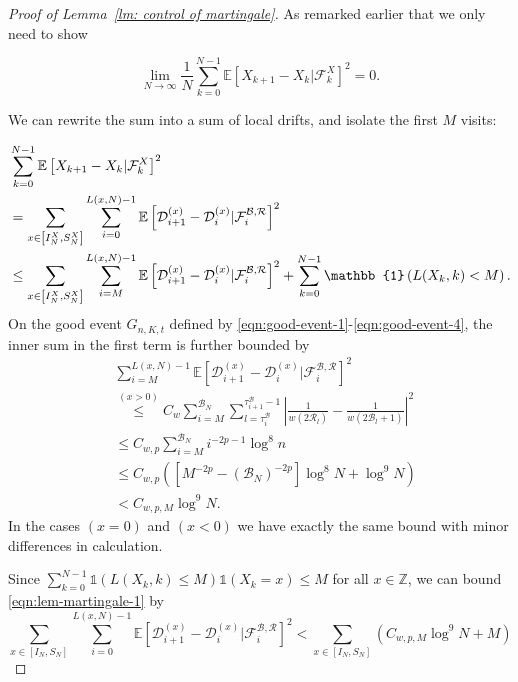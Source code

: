 \documentclass[twoside,12pt, a4paper]{article}
\numberwithin{equation}{section}
\theoremstyle{remark}
\begin{document}
	\begin{proof}[Proof of Lemma~\ref{lm: control of martingale}]
		As remarked earlier that we only need to show
		
		\[
		\lim_{N \to \infty } \frac{1}{N} \sum_{k = 0}^{N-1} \mathbb{E}\left[ X_{k+1} - X_k | \mathcal{F}_k^X \right]^2 = 0
		.\] 
		
		
		We can rewrite the sum into a sum of local drifts, and isolate the first $M$ visits:
		
		\begin{align}
			&\sum_{k = 0}^{N-1} \mathbb{E}\left[ X_{k+1} - X_k | \mathcal{F}_k^X \right]^2
			\notag
			\\
			&= \sum_{x \in \left[ I_N^X, S_N^X \right]} \sum_{i = 0}^{L(x, N) - 1} \mathbb{E}\left[ \mathcal{D}_{i+1}^{(x)} - \mathcal{D}_i^{(x)} | \mathcal{F}_{i}^{\mathcal{B}, \mathcal{R}} \right]^2  
			\notag
			\\
			&\le  \sum_{x \in \left[ I_N^X, S_N^X \right]} \sum_{i = M}^{L(x,N) - 1} \mathbb{E}\left[ \mathcal{D}_{i+1}^{(x)} - \mathcal{D}_i^{(x)} | \mathcal{F}_{i}^{\mathcal{B}, \mathcal{R}} \right]^2  + 
			\sum_{k = 0}^{N - 1} \mathbb{1}\left( L(X_k, k) <  M \right) 
			\label{eqn:lem-martingale-1}
			.\end{align}
		On the good event $G_{n, K, t}$ defined by \eqref{eqn:good-event-1}-\eqref{eqn:good-event-4},
		the inner sum in the first term is further bounded by
		\begin{align*}
			&\sum_{i =M}^{ L(x, N) - 1} \mathbb{E}\left[ \mathcal{D}_{i+1}^{(x)} - \mathcal{D}_i^{(x)} | \mathcal{F}_{i}^{\mathcal{B}, \mathcal{R}} \right]^2\\
			&\stackrel{(x > 0)}{\le} C_w \sum_{i = M}^{\mathcal{B}_N} \sum_{l = \tau_i^{\mathcal{B}}}^{\tau_{i+1}^{\mathcal{B}}-1} 
			\left| \frac{1}{w(2 \mathcal{R}_l)} - \frac{1}{w\left( 2 \mathcal{B}_l + 1 \right) } \right|^2 \\
			&\le C_{w, p} \sum_{i = M}^{\mathcal{B}_N} i^{- 2 p - 1} \log^8 n  \\
			&\le C_{w, p} \left(\left[ M^{- 2 p} -\left(  \mathcal{B}_N \right) ^{- 2 p} \right] \log^8 N + \log^9 N\right)  \\
			&< C_{w, p, M} \log^9 N
			.
		\end{align*}
		In the cases $(x=0)$ and $(x < 0)$ we have exactly the same bound with minor differences in calculation.
		
		Since $\sum_{k = 0}^{N-1} \mathbb{1}\left( L(X_k, k) \le M \right) \mathbb{1}(X_k = x) \le  M$ for all $x \in \mathbb{Z}$, we can bound \eqref{eqn:lem-martingale-1} by
		\begin{equation*}
			\sum_{x \in \left[ I_N, S_N \right]} \sum_{i = 0}^{L(x,N) - 1} \mathbb{E}\left[ \mathcal{D}_{i+1}^{(x)} - \mathcal{D}_i^{(x)} | \mathcal{F}_{i}^{\mathcal{B}, \mathcal{R}} \right]^2 
			< \sum_{x \in \left[ I_N, S_N \right]} (C_{w, p, M} \log^9 N +M )
		\end{equation*}
		

\end{proof}
\end{document}
